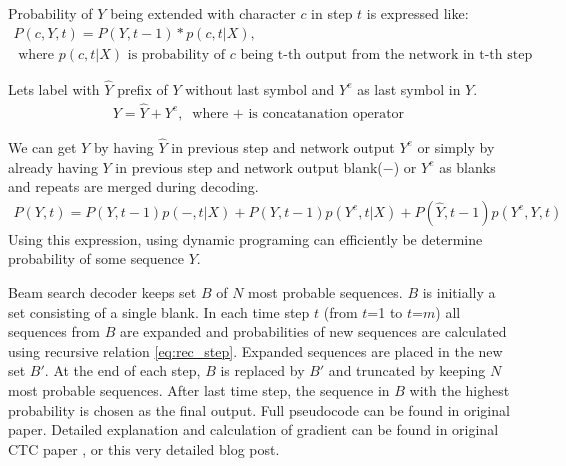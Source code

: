 \documentclass[times, utf8, diplomski, numeric, english]{fer}
\begin{document}
Probability of $Y$ being extended with character $c$ in step $t$ is expressed like:
\begin{equation}
\begin{gathered}
P(c, Y, t) = P(Y, t-1) * p(c, t|X), \\\text{~where $p(c, t|X)$ is probability of $c$ being t-th output from the network in t-th step}.
\end{gathered}
\end{equation}

Lets label  with $\hat{Y}$ prefix of $Y$ without last symbol and $Y^e$ as last symbol in $Y$.
\begin{equation}
\begin{gathered}
Y = \hat{Y} + Y^e, \text{~where $+$ is concatanation operator}
\end{gathered}
\end{equation}


We can get $Y$ by having $\hat{Y}$ in previous step and network output $Y^e$ or simply by
already having $Y$ in previous step and network output blank($-$) or $Y^e$ as blanks and repeats are merged during decoding.
\begin{equation}
\begin{gathered}
\label{eq:rec_step}
P(Y, t) = P(Y, t-1) p(-, t|X) +  P(Y, t-1)  p(Y^e, t|X) +  P(\hat{Y}, t-1)  p(Y^e, Y, t) 
\end{gathered}
\end{equation}
Using this expression, using dynamic programing can efficiently be determine probability of some sequence $Y$.

Beam search decoder keeps set $B$ of $N$ most probable sequences. $B$ is initially a set consisting of a single blank. In each time step $t$ (from $t$=1 to $t$=$m$) all sequences from $B$ are expanded and probabilities of new sequences are calculated using recursive relation \ref{eq:rec_step}. Expanded sequences are placed in the new set $B'$. At the end of each step, $B$ is replaced by $B'$ and truncated by keeping $N$ most probable sequences. 
After last time step, the sequence in $B$ with the highest probability is chosen as the final output.
Full pseudocode can be found in original paper\cite{graves_decode}. 
Detailed explanation and calculation of gradient can be found in original CTC paper \cite{Graves:2006:CTC:1143844.1143891}, or this very detailed blog post\cite{ctc-blog}.
\end{document}
